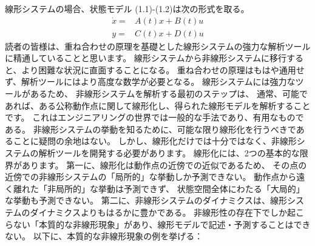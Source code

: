 \documentclass{jsarticle}
\begin{document}
    線形システムの場合、状態モデル (1.1)-(1.2)は次の形式を取る。
    \begin{align}
        \dot x = & A(t)x+B(t)u \\
        y =& C(t)x + D(t)u
    \end{align}
    読者の皆様は、重ね合わせの原理を基礎とした線形システムの強力な解析ツールに精通していることと思います。
    線形システムから非線形システムに移行すると、より困難な状況に直面することになる。
    重ね合わせの原理はもはや通用せず、解析ツールにはより高度な数学が必要となる。
    線形システムには強力なツールがあるため、
    非線形システムを解析する最初のステップは、
    通常、可能であれば、ある公称動作点に関して線形化し、得られた線形モデルを解析することです。
    これはエンジニアリングの世界では一般的な手法であり、有用なものである。
    非線形システムの挙動を知るために、可能な限り線形化を行うべきであることに疑問の余地はない。
    しかし、線形化だけでは十分ではなく、非線形システムの解析ツールを開発する必要があります。
    線形化には、2つの基本的な限界があります。
    第一に、線形化は動作点の近傍での近似であるため、
    その点の近傍での非線形システムの「局所的」な挙動しか予測できない。
    動作点から遠く離れた「非局所的」な挙動は予測できず、
    状態空間全体にわたる「大局的」な挙動も予測できない。
    第二に、非線形システムのダイナミクスは、線形システムのダイナミクスよりもはるかに豊かである。
    非線形性の存在下でしか起こらない「本質的な非線形現象」があり、線形モデルで記述・予測することはできない。
    以下に、本質的な非線形現象の例を挙げる：
\end{document}
